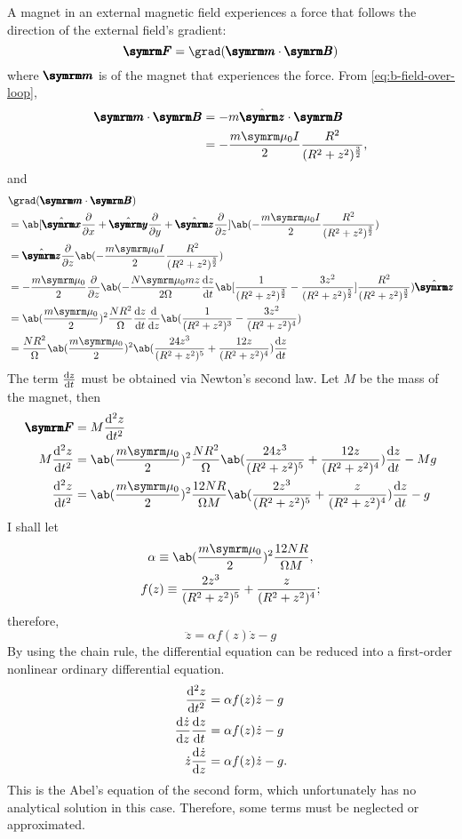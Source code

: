 A magnet in an external magnetic field experiences a force that follows the direction of the external field's gradient: \cite{boyer-1988}
\begin{equation}
	\vv{F} = \grad(\vv{m}\cdot\vv{B})
\end{equation}
where $\vv{m}$ is of the magnet that experiences the force. From \cref{eq:b-field-over-loop},
\begin{align}
	\vv{m}\cdot\vv{B} &= -m\zhat\cdot\vv{B} \\
					  &= -\frac{m\bperm I}{2}\frac{R^2}{(R^2 + z^2)^{\frac{3}{2}}},
\end{align}
and
\begin{align}
	&\grad(\vv{m}\cdot\vv{B}) \nonumber\\
	&= \ab[\xhat\pdv{}{x} + \yhat\pdv{}{y} + \zhat\pdv{}{z}]\ab(-\frac{m\bperm I}{2}\frac{R^2}{(R^2 + z^2)^{\frac{3}{2}}}) \\
	&= \zhat\pdv*{\ab(-\frac{m\bperm I}{2}\frac{R^2}{(R^2 + z^2)^{\frac{3}{2}}})}{z} \\
	&= -\frac{m\bperm}{2}\pdv*{\ab(-\frac{N\bperm mz}{2\Omega}\odv{z}{t}\ab[\frac{1}{(R^2 + z^2)^{\frac{3}{2}}} - \frac{3z^2}{(R^2 + z^2)^{\frac{5}{2}}}]\frac{R^2}{(R^2 + z^2)^{\frac{3}{2}}})}{z}\zhat \nonumber\\
	&= \ab(\frac{m\bperm}{2})^2\frac{NR^2}{\Omega}\odv{z}{t}\odv*{\ab(\frac{1}{(R^2 + z^2)^{3}} - \frac{3z^2}{(R^2 + z^2)^4})}{z} \\
	&= \frac{NR^2}{\Omega}\ab(\frac{m\bperm}{2})^2\ab(\frac{24z^3}{(R^2 + z^2)^5} + \frac{12z}{(R^2 + z^2)^4})\odv{z}{t}
\end{align}
The term $\odv{z}{t}$ must be obtained via Newton's second law. Let $M$ be the mass of the magnet, then
\begin{align}
	\vv{F} &= M\odv[ord = 2]{z}{t} \\
	M\odv[ord = 2]{z}{t} &= \ab(\frac{m\bperm}{2})^2\frac{NR^2}{\Omega}\ab(\frac{24z^3}{(R^2 + z^2)^5} + \frac{12z}{(R^2 + z^2)^4})\odv{z}{t} - Mg \\
	\odv[ord = 2]{z}{t} &= \ab(\frac{m\bperm}{2})^2\frac{12NR}{\Omega M}\ab(\frac{2z^3}{(R^2 + z^2)^5} + \frac{z}{(R^2 + z^2)^4})\odv{z}{t} - g
\end{align}
I shall let
\begin{gather}
	\alpha \equiv \ab(\frac{m\bperm}{2})^2\frac{12NR}{\Omega M}, \\
	f(z) \equiv \frac{2z^3}{(R^2 + z^2)^5} + \frac{z}{(R^2 + z^2)^4};
\end{gather}
therefore,
\begin{equation}
	\ddot{z} = \alpha f(z)\dot{z} - g
\end{equation}
By using the chain rule, the differential equation can be reduced into a first-order nonlinear ordinary differential equation.
\begin{align}
	\odv[ord = 2]{z}{t} &= \alpha f(z)\dot{z} - g \\
	\odv{\dot{z}}{z}\odv{z}{t} &= \alpha f(z)\dot{z} - g \\
	\dot{z}\odv{\dot{z}}{z} &= \alpha f(z)\dot{z} - g.
\end{align}
This is the Abel's equation of the second form, which unfortunately has no analytical solution in this case. Therefore, some terms must be neglected or approximated.

